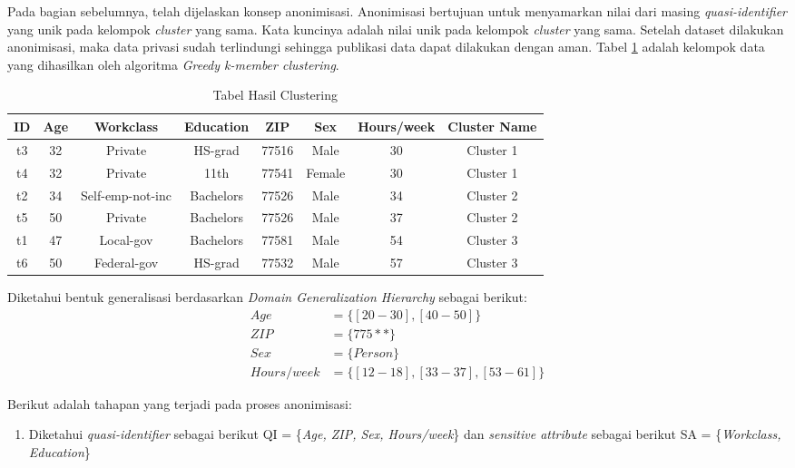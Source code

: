 \documentclass[a4paper,twoside]{article}
\begin{document}
\begin{enumerate}
Pada bagian sebelumnya, telah dijelaskan konsep anonimisasi. Anonimisasi bertujuan untuk menyamarkan nilai dari masing \textit{quasi-identifier} yang unik pada kelompok \textit{cluster} yang sama. Kata kuncinya adalah nilai unik pada kelompok \textit{cluster} yang sama. Setelah dataset dilakukan anonimisasi, maka data privasi sudah terlindungi sehingga publikasi data dapat dilakukan dengan aman. Tabel \ref{table:clustering} adalah kelompok data yang dihasilkan oleh algoritma \textit{Greedy k-member clustering}. 
\begin{table}[H]
\centering
\caption{Tabel Hasil Clustering}
\begin{tabular}{c c c c c c c c}
\hline 
ID & Age & Workclass & Education & ZIP & Sex & Hours/week & Cluster Name\\ 
\hline 
t3 & 32 & Private & HS-grad & 77516 & Male & 30 & Cluster 1 \\ 
t4 & 32 & Private & 11th & 77541 & Female & 30 & Cluster 1 \\ 
\hline 
t2 & 34 & Self-emp-not-inc & Bachelors & 77526 & Male & 34 & Cluster 2 \\ 
t5 & 50 & Private & Bachelors & 77526 & Male & 37	& Cluster 2\\ 
\hline 
t1 & 47 & Local-gov & Bachelors & 77581 & Male & 54 & Cluster 3\\ 
t6 & 50 & Federal-gov & HS-grad & 77532 & Male & 57 & Cluster 3\\ 
\hline 
\end{tabular} 
\label{table:clustering}
\end{table}
\vspace{0.4cm}

\noindent Diketahui bentuk generalisasi berdasarkan \textit{Domain Generalization Hierarchy} sebagai berikut:
\begin{align*}
Age &= \{[20-30], [40-50]\}\\
ZIP &= \{775**\}\\
Sex &= \{Person\}\\
Hours/week &=\{[12-18], [33-37], [53-61]\}
\end{align*} 

\noindent Berikut adalah tahapan yang terjadi pada proses anonimisasi:
\begin{enumerate}

\item Diketahui \textit{quasi-identifier} sebagai berikut QI = \{\textit{Age, ZIP, Sex, Hours/week}\} dan \textit{sensitive attribute} sebagai berikut SA = \{\textit{Workclass, Education}\}


\end{enumerate}
\end{enumerate}
\end{document}
